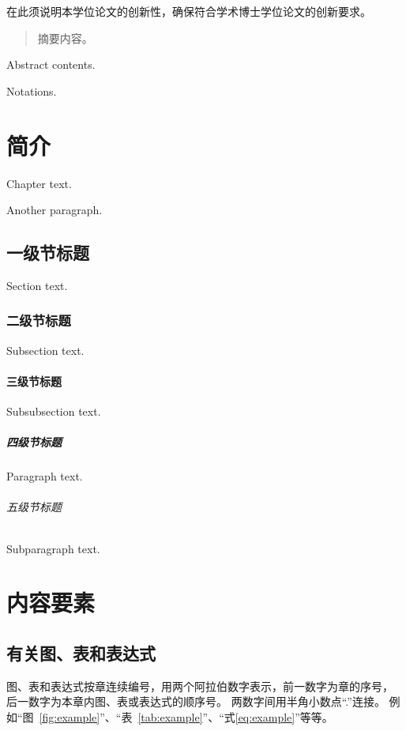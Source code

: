 \frontmatter
\begin{innovations}
  在此须说明本学位论文的创新性，确保符合学术博士学位论文的创新要求。
\end{innovations}


\begin{abstract}
  摘要内容。
\end{abstract}

\begin{abstract*}
  Abstract contents.
\end{abstract*}

\tableofcontents

\begin{notation}
  Notations.
\end{notation}

\mainmatter
\chapter{简介}
Chapter text. \par
Another paragraph.
\section{一级节标题}
Section text.
\subsection{二级节标题}
Subsection text.
\subsubsection{三级节标题}
Subsubsection text.
\paragraph{四级节标题}
Paragraph text.
\subparagraph{五级节标题}
Subparagraph text.

\chapter{内容要素}

\section{有关图、表和表达式}

图、表和表达式按章连续编号，用两个阿拉伯数字表示，前一数字为章的序号，
后一数字为本章内图、表或表达式的顺序号。
两数字间用半角小数点“.”连接。
例如“图~\ref{fig:example}”、“表~\ref{tab:example}”、“式\eqref{eq:example}”等等。

